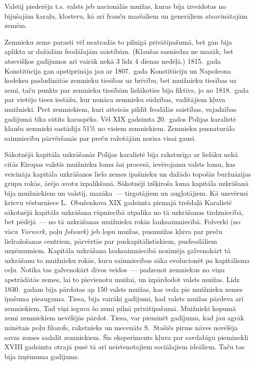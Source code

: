 \documentclass[twoside,a5paper,12pt,fleqn,openany]{extbook}
\newcommand{\pltxti}[1]{\textit{\textpolish{#1}}}
\newcommand{\detxti}[1]{\textit{\textgerman{#1}}}
\begin{document}
Valstij piederēja t.s. valsts jeb nacionālās muižas, kuras bija izveidotas no bijušajām karaļu, klosteru, kā arī franču maršaliem un ģenerāļiem atsavinātajām zemēm.

Zemnieku zeme parasti vēl neatradās to pilnīgā privātīpašumā, bet gan bija aplikta ar dažādām feodālajām saistībām. (Klaušas sasniedza ne mazāk, bet atsevišķos gadījumos arī vairāk nekā 3 līdz 4 dienas nedēļā.) 1815.~gada Konstitūcija gan apstiprināja jau ar 1807.~gada Konstitūciju un Napoleona kodeksu pasludinātās zemnieku tiesības uz brīvību, bet muižnieku tiesības uz zemi, taču punkts par zemnieku tiesībām lielākoties bija fiktīvs, jo no 1818.~gada par vietējo tiesu iestāžu, kur nonāca zemnieku sūdzības, vadītājiem kļuva muižnieki. Pret zemniekiem, kuri atteicās pildīt feodālās saistības, vajadzības gadījumā tika sūtīts karaspēks. Vēl XIX gadsimta 20.~gados Polijas karalistē klaušu zemnieki sastādīja 51\% no visiem zemniekiem. Zemnieku pusnaturālo saimniecību pārvēršanās par preču ražotājām norisa visai gausi.

Sākotnējā kapitāla uzkrāšanās Polijas karalistē bija raksturīga ar lielāku nekā citās Eiropas valstīs muižnieku lomu šai procesā, ievērojamu valsts lomu, kas veicināja kapitāla uzkrāšanos lielo zemes īpašnieku un dažādo topošās buržuāzijas grupu rokās, ārējo avotu izpalikšanā. Sākotnēji izšķiroša loma kapitāla uzkrāšanā bija muižniekiem un valstij, mazāka~--- tirgotājiem un augļotājiem. Kā uzsvērusi krievu vēsturniece L.~Obušenkova XIX gadsimta pirmajā trešdaļā Karalistē sākotnējā kapitāla uzkrāšana rūpniecībā atpalika no tā uzkrāšanas tirdzniecībā, bet pēdējā~--- no tā uzkrāšanas muižnieku rokās lauksaimniecībā. Folverki (no vācu \detxti{Vorwerk}, poļu \pltxti{folwark}) jeb lopu muižas, pusmuižas kļuva par preču lielražošanas centriem, pārvērtās par puskapitālistiskiem, pusfeodāliem uzņēmumiem. Kapitāla uzkrāšana lauksaimniecībā nozīmēja galvenokārt tā uzkrāšanu to muižnieku rokās, kuru saimniecības sāka evolucionēt pa kapitālisma ceļu. Notika tas galvenokārt divos veidos~--- padzenot zemniekus no viņu apstrādātās zemes, lai to pievienotu muižai, un izpārdodot valsts muižas. Līdz 1830.~gadam bija pārdotas ap 150 valsts muižas, kas veda pie muižnieku zemes īpašuma pieauguma. Tiesa, bija vairāki gadījumi, kad valsts muižas pārdeva arī zemniekiem. Tad viņi ieguva šo zemi pilnā privātīpašumā. Muižnieki kopumā zemi zemniekiem nevēlējās pārdot. Tiesa, var pieminēt gadījumu, kad jau agrāk minētais poļu filozofs, rakstnieks un mecenāts S.~Stašičs pirms nāves novēlēja savas zemes sadalīt zemniekiem. Šis eksperiments kļuva par savdabīgu pieminekli XVIII gadsimta otrajā pusē tā arī neīstenotajiem sociālajiem ideāliem. Taču tas bija izņēmuma gadījums.
\end{document}
